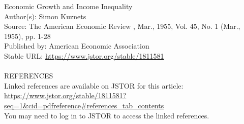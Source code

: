 Economic Growth and Income Inequality\\
Author(s): Simon Kuznets\\
Source: The American Economic Review , Mar., 1955, Vol. 45, No. 1 (Mar., 1955), pp. 1-28\\
Published by: American Economic Association\\
Stable URL: \url{https://www.jstor.org/stable/1811581}\\\\
REFERENCES\\
Linked references are available on JSTOR for this article:\\
\url{https://www.jstor.org/stable/1811581?seq=1&cid=pdfreference#references_tab_contents}\\
You may need to log in to JSTOR to access the linked references.
\let\cleardoublepage\clearpage

